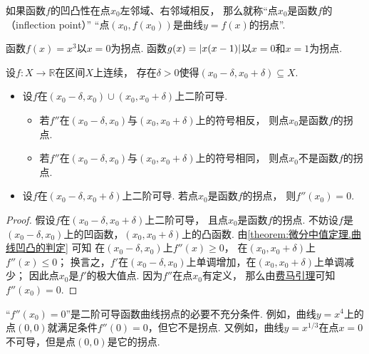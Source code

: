 \begin{definition}\label{definition:单调性和凹凸性.拐点}
如果函数\(f\)的凹凸性在点\(x_0\)左邻域、右邻域相反，
那么就称“点\(x_0\)是函数\(f\)的（inflection point）”
“点\((x_0,f(x_0))\)是曲线\(y=f(x)\)的拐点”.
\end{definition}

\begin{example}
函数\(f(x) = x^3\)以\(x=0\)为拐点.
函数\(g(x) = \abs{x(x-1)}\)以\(x=0\)和\(x=1\)为拐点.
\end{example}

\begin{theorem}\label{theorem:单调性和凹凸性.拐点的判定}
设\(f\colon X\to\mathbb{R}\)在区间\(X\)上连续，
存在\(\delta>0\)使得\((x_0-\delta,x_0+\delta) \subseteq X\).
\begin{itemize}
	\item 设\(f\)在\((x_0-\delta,x_0)\cup(x_0,x_0+\delta)\)上二阶可导.
	\begin{itemize}
		\item 若\(f''\)在\((x_0-\delta,x_0)\)与\((x_0,x_0+\delta)\)上的符号相反，
		则点\(x_0\)是函数\(f\)的拐点.
		\item 若\(f''\)在\((x_0-\delta,x_0)\)与\((x_0,x_0+\delta)\)上的符号相同，
		则点\(x_0\)不是函数\(f\)的拐点.
	\end{itemize}

	\item 设\(f\)在\((x_0-\delta,x_0+\delta)\)上二阶可导.
	若点\(x_0\)是函数\(f\)的拐点，
	则\(f''(x_0) = 0\).
\end{itemize}
\begin{proof}
假设\(f\)在\((x_0-\delta,x_0+\delta)\)上二阶可导，
且点\(x_0\)是函数\(f\)的拐点.
不妨设\(f\)是\((x_0-\delta,x_0)\)上的凹函数，\((x_0,x_0+\delta)\)上的凸函数.
由\cref{theorem:微分中值定理.曲线凹凸的判定} 可知
在\((x_0-\delta,x_0)\)上\(f''(x)\geq0\)，
在\((x_0,x_0+\delta)\)上\(f''(x)\leq0\)；
换言之，\(f'\)在\((x_0-\delta,x_0)\)上单调增加，在\((x_0,x_0+\delta)\)上单调减少；
因此点\(x_0\)是\(f'\)的极大值点.
因为\(f''\)在点\(x_0\)有定义，
那么由\hyperref[theorem:微分中值定理.费马引理]{费马引理}可知\(f''(x_0)=0\).
\end{proof}
\end{theorem}
\begin{remark}
“\(f''(x_0) = 0\)”是二阶可导函数曲线拐点的必要不充分条件.
例如，曲线\(y = x^4\)上的点\((0,0)\)就满足条件\(f''(0) = 0\)，但它不是拐点.
又例如，曲线\(y = x^{1/3}\)在点\(x=0\)不可导，但是点\((0,0)\)是它的拐点.
\end{remark}

